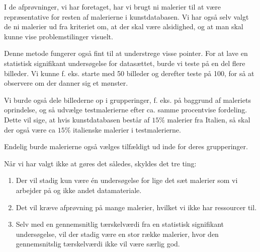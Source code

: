 I de afprøvninger, vi har foretaget, har vi brugt ni malerier til at være
repræsentative for resten af malerierne i kunstdatabasen. Vi har også selv
valgt de ni malerier ud fra kriteriet om, at der skal være alsidighed, og at
man skal kunne vise problemstilinger visuelt.

Denne metode fungerer også fint til at understrege visse pointer.
For at lave en statistisk signifikant undersøgelse for datasættet, burde
vi teste på en del flere billeder. Vi kunne f. eks. starte med 50 billeder
og derefter teste på 100, for så at observere om der danner sig et mønster.

Vi burde også dele billederne op i grupperinger, f. eks. på baggrund af maleriets
oprindelse, og så udvælge testmalerierne efter ca. samme procentvise
fordeling. Dette vil sige, at hvis kunstdatabasen består af $15 \%$ malerier fra
Italien, så skal der også være ca $15 \%$ italienske malerier i testmalerierne.

Endelig burde malerierne også vælges tilfældigt ud inde for deres
grupperinger.

Når vi har valgt ikke at gøres det således, skyldes det tre ting:

\begin{enumerate}
	\item Der vil stadig kun være \'{e}n undersøgelse for lige det sæt
	malerier som vi arbejder på og ikke andet datamateriale.
	\item Det vil kræve afprøvning på mange malerier, hvilket vi ikke har
	ressourcer til. 
	\item Selv med en gennemsnitlig tærskelværdi fra en statistisk
	signifikant undersøgelse, vil der stadig være en stor række
	malerier,
	hvor den gennemsnitslig tærskelværdi ikke vil være særlig god. 
\end{enumerate}
